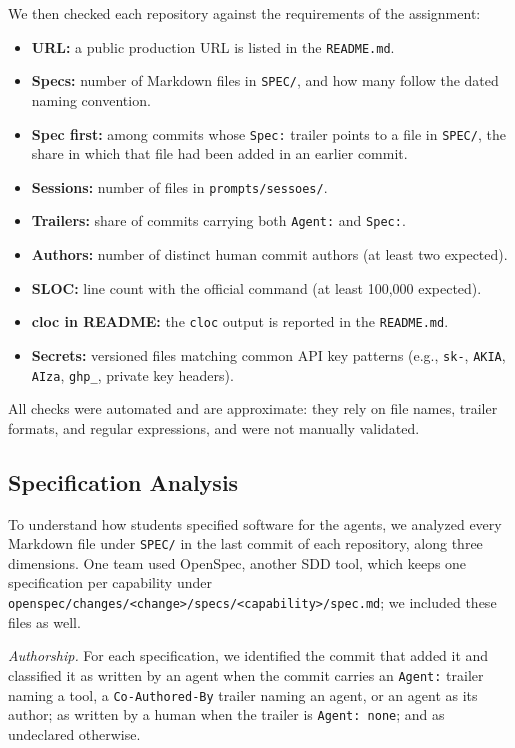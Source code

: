 \documentclass[conference]{IEEEtran}
\begin{document}
We then checked each repository against the requirements of the assignment:
\begin{itemize}
\item \textbf{URL:} a public production URL is listed in the \texttt{README.md}.
\item \textbf{Specs:} number of Markdown files in \texttt{SPEC/}, and how many follow the dated naming convention.
\item \textbf{Spec first:} among commits whose \texttt{Spec:} trailer points to a file in \texttt{SPEC/}, the share in which that file had been added in an earlier commit.
\item \textbf{Sessions:} number of files in \texttt{prompts/sessoes/}.
\item \textbf{Trailers:} share of commits carrying both \texttt{Agent:} and \texttt{Spec:}.
\item \textbf{Authors:} number of distinct human commit authors (at least two expected).
\item \textbf{SLOC:} line count with the official command (at least 100,000 expected).
\item \textbf{cloc in README:} the \texttt{cloc} output is reported in the \texttt{README.md}.
\item \textbf{Secrets:} versioned files matching common API key patterns (e.g., \texttt{sk-}, \texttt{AKIA}, \texttt{AIza}, \texttt{ghp\_}, private key headers).
\end{itemize}
All checks were automated and are approximate: they rely on file names, trailer formats, and regular expressions, and were not manually validated.

\subsection{Specification Analysis}

To understand how students specified software for the agents, we analyzed every Markdown file under \texttt{SPEC/} in the last commit of each repository, along three dimensions. One team used OpenSpec, another SDD tool, which keeps one specification per capability under \nolinkurl{openspec/changes/<change>/specs/<capability>/spec.md}; we included these files as well.

\emph{Authorship.} For each specification, we identified the commit that added it and classified it as written by an agent when the commit carries an \texttt{Agent:} trailer naming a tool, a \texttt{Co-Authored-By} trailer naming an agent, or an agent as its author; as written by a human when the trailer is \texttt{Agent: none}; and as undeclared otherwise.
\end{document}

